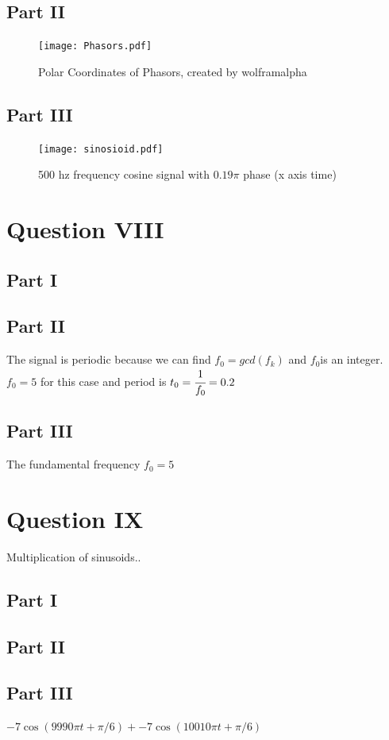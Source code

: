 \documentclass[a4paper, 12pt, titlepage]{article}
\begin{document}
\subsection{Part II}
\begin{figure}[H]
	\centering
	\caption{Polar Coordinates of Phasors, created by wolframalpha }
	\label{fig:Graphic}
	\texttt{[image: Phasors.pdf]} %
\end{figure}

\subsection{Part III}
\begin{figure}[H]
	\centering
	\caption{500 hz frequency cosine signal with $0.19\pi$ phase (x axis time)}
	\label{fig:Graphic}
	\texttt{[image: sinosioid.pdf]} %
\end{figure}
\section{Question VIII}
    \subsection{Part I}
    \subsection{Part II}
The signal is periodic because we can find $ f_0 = gcd(f_k) $ \space and $f_0$\space is an integer. $ f_0 = 5 $ for this case and period is $ t_0 = \cfrac{1}{f_0} = 0.2 $

\subsection{Part III} 
The fundamental frequency $f_0 = 5 $ 
\section{Question IX}
    Multiplication of sinusoids..
    \subsection{Part I}
    \subsection{Part II}
    \subsection{Part III}
    $-7\cos(9990 \pi t + \pi/6) + -7\cos(10010 \pi t + \pi/6) $
\end{document}
